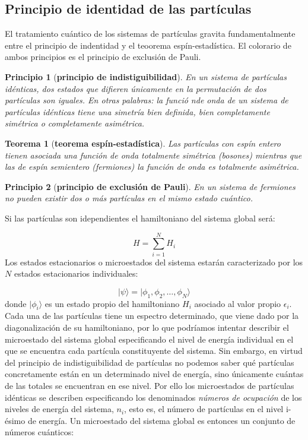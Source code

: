 \documentclass[12pt,a4paper]{article}
\numberwithin{equation}{section}
\numberwithin{figure}{section}
\newtheorem{theorem}{Teorema}[section]
\newtheorem{principio}{Principio}[section]
\theoremstyle{definition}
\begin{document}
\subsection{Principio de identidad de las partículas}

El tratamiento cuántico de los sistemas de partículas gravita fundamentalmente entre el principio de indentidad y el teoorema espín-estadística. El colorario de ambos principios es el principio de exclusión de Pauli.

\begin{principio}[{\bf principio de indistiguibilidad}]
En un sistema de partículas idénticas, dos estados que difieren únicamente en la permutación de dos partículas son iguales. En otras palabras: la funció nde onda de un sistema de partículas idénticas tiene una simetría bien definida, bien completamente simétrica o completamente asimétrica. 
\end{principio}

\begin{theorem}[{\bf teorema espín-estadística}]
Las partículas con espín entero tienen asociada una función de onda totalmente simétrica (bosones) mientras que las de espín semientero (fermiones) la función de onda es totalmente asimétrica. 
\end{theorem}

\begin{principio}[{\bf principio de exclusión de Pauli}]
En un sistema de fermiones no pueden existir dos o más partículas en el mismo estado cuántico. 
\end{principio}

Si las partículas son idependientes el hamiltoniano del sistema global será:

\begin{equation}
H = \sum_{i=1}^N H_i
\end{equation}
Los estados estacionarios o microestados del sistema estarán caracterizado por los $N$ estados estacionarios individuales: 

\begin{equation}
|\psi \rangle = | \phi_1, \phi_2, \ldots, \phi_N \rangle
\end{equation}
donde $|\phi_i\rangle$ es un estado propio del hamiltoniano $H_i$ asociado al valor propio $\epsilon_i$. Cada una de las partículas tiene un espectro determinado, que viene dado por la diagonalización de su hamiltoniano, por lo que podríamos intentar describir el microestado del sistema global especificando el nivel de energía individual en el que se encuentra cada partícula constituyente del sistema. Sin embargo, en virtud del principio de indistiguibilidad de partículas no podemos saber qué partículas concretamente están en un determinado nivel de energía, sino únicamente cuántas de las totales se encuentran en ese nivel. Por ello los microestados de partículas idénticas se describen especificando los denominados \textit{números de ocupación} de los niveles de energía del sistema, $n_i$, esto es, el número de partículas en el nivel i-ésimo de energía. Un microestado del sistema global es entonces un conjunto de números cuánticos:
\end{document}
